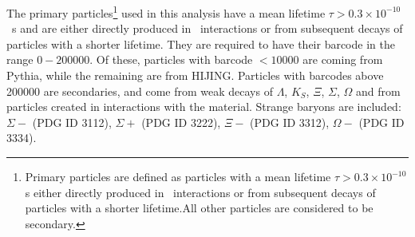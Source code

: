 The primary particles\footnote{Primary particles are defined as particles with a mean lifetime $\tau>0.3\times 10^{-10}$ s either directly produced in \pp\ interactions or from subsequent decays of particles with a shorter lifetime.All other particles are considered to be secondary.}
used in this analysis have a mean lifetime \mbox{$\tau > 0.3 \times 10^{-10}$~s} and are either directly produced in \pp\ interactions or from subsequent decays of particles with a shorter lifetime.
They are required to have their barcode in the range $0 - 200000$.
Of these, particles with barcode $< 10000$ are coming from Pythia, while the remaining are from HIJING.
Particles with barcodes above 200000 are secondaries, and come from weak decays of $\Lambda$, $K_{S}$, $\Xi$, $\Sigma$, $\Omega$ and from particles created in interactions with the material.
Strange baryons are included: $\Sigma-$ (PDG ID 3112), $\Sigma+$ (PDG ID 3222), $\Xi-$ (PDG ID 3312), $\Omega-$ (PDG ID 3334).


